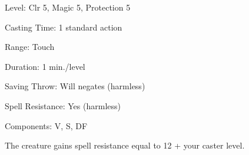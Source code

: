 
\begin{description*}
\item[Level:] Clr 5, Magic 5, Protection 5
\item[Casting Time:] 1 standard action
\item[Range:] Touch
\item[Duration:] 1 min./level
\item[Saving Throw:] Will negates (harmless)
\item[Spell Resistance:] Yes (harmless)
\item[Components:] V, S, DF
\end{description*}

The creature gains spell resistance equal to 12 + your caster level.
